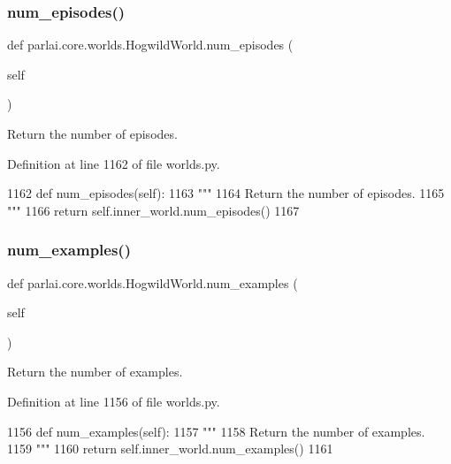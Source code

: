 \subsubsection{\texorpdfstring{num\+\_\+episodes()}{num\_episodes()}}
{\footnotesize\ttfamily def parlai.\+core.\+worlds.\+Hogwild\+World.\+num\+\_\+episodes (\begin{DoxyParamCaption}\item[{}]{self }\end{DoxyParamCaption})}

\begin{DoxyVerb}Return the number of episodes.
\end{DoxyVerb}
 

Definition at line 1162 of file worlds.\+py.


\begin{DoxyCode}
1162     \textcolor{keyword}{def }num\_episodes(self):
1163         \textcolor{stringliteral}{"""}
1164 \textcolor{stringliteral}{        Return the number of episodes.}
1165 \textcolor{stringliteral}{        """}
1166         \textcolor{keywordflow}{return} self.inner\_world.num\_episodes()
1167 
\end{DoxyCode}
\mbox{\label{classparlai_1_1core_1_1worlds_1_1HogwildWorld_ae488971481ec6c8ba803b2404ad70e56}} 
\subsubsection{\texorpdfstring{num\+\_\+examples()}{num\_examples()}}
{\footnotesize\ttfamily def parlai.\+core.\+worlds.\+Hogwild\+World.\+num\+\_\+examples (\begin{DoxyParamCaption}\item[{}]{self }\end{DoxyParamCaption})}

\begin{DoxyVerb}Return the number of examples.
\end{DoxyVerb}
 

Definition at line 1156 of file worlds.\+py.


\begin{DoxyCode}
1156     \textcolor{keyword}{def }num\_examples(self):
1157         \textcolor{stringliteral}{"""}
1158 \textcolor{stringliteral}{        Return the number of examples.}
1159 \textcolor{stringliteral}{        """}
1160         \textcolor{keywordflow}{return} self.inner\_world.num\_examples()
1161 
\end{DoxyCode}
\mbox{\label{classparlai_1_1core_1_1worlds_1_1HogwildWorld_a9853e25a58444d4516c3f6da8c44d9c2}} 
